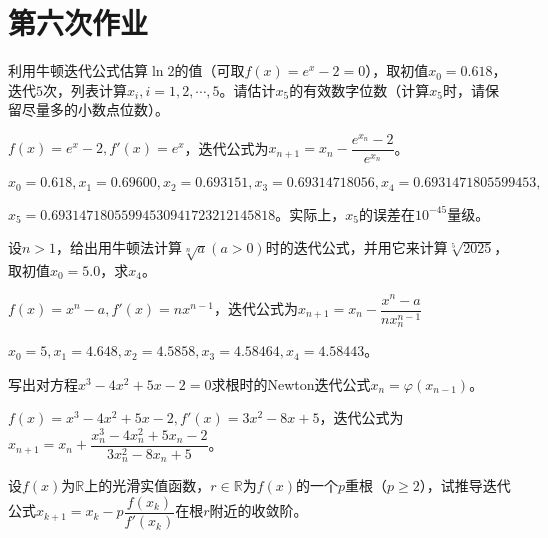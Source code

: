 \chapter{第六次作业}

    \begin{homework}[6pts]
        利用牛顿迭代公式估算$\ln 2$的值（可取$f(x)=e^x-2=0$），取初值$x_0=0.618$，迭代$5$次，列表计算$x_i, i=1,2,\cdots,5$。请估计$x_5$的有效数字位数（计算$x_5$时，请保留尽量多的小数点位数）。
    \end{homework}

    \begin{solution}
        $f(x)=e^x-2,f'(x)=e^x$，迭代公式为$x_{n+1}=x_n-\dfrac{e^{x_n}-2}{e^{x_n}}$。

        $x_0=0.618,x_1=0.69600,x_2=0.693151,x_3=0.69314718056,x_4=0.6931471805599453,$

        $x_5=0.69314718055994530941723212145818$。实际上，$x_5$的误差在$10^{-45}$量级。
    \end{solution}

    \begin{homework}[6pts]
        设$n>1$，给出用牛顿法计算$\sqrt[n]{a}(a>0)$时的迭代公式，并用它来计算$\sqrt[5]{2025}$，取初值$x_0=5.0$，求$x_4$。
    \end{homework}

    \begin{solution}
        $f(x)=x^n-a,f'(x)=nx^{n-1}$，迭代公式为$x_{n+1}=x_n-\dfrac{x^n-a}{nx_n^{n-1}}$

        $x_0=5,x_1=4.648,x_2=4.5858,x_3=4.58464,x_4=4.58443$。
    \end{solution}

    \begin{homework}[10pts]
        写出对方程$x^3-4x^2+5x-2=0$求根时的Newton迭代公式$x_n=\varphi(x_{n-1})$。
    \end{homework}

    \begin{solution}
        $f(x)=x^3-4x^2+5x-2,f'(x)=3x^2-8x+5$，迭代公式为$x_{n+1}=x_n+\dfrac{x_n^3-4x_n^2+5x_n-2}{3x_n^2-8x_n+5}$。
    \end{solution}

    \begin{homework}[10pts]
        设$f(x)$为$\mathbb{R}$上的光滑实值函数，$r\in\mathbb{R}$为$f(x)$的一个$p$重根（$p\geq2$），试推导迭代公式$x_{k+1}=x_k-p\dfrac{f(x_k)}{f'(x_k)}$在根$r$附近的收敛阶。
    \end{homework}

